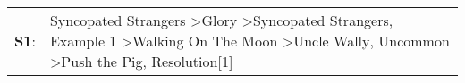 \begin{supertabular}{p{0.03\textwidth}p{0.92\textwidth}}
 \textbf{S1}:  &  Syncopated Strangers\textsuperscript{} \textgreater \enspace Glory\textsuperscript{} \textgreater \enspace Syncopated Strangers\textsuperscript{}, \enspace Example 1\textsuperscript{} \textgreater \enspace Walking On The Moon\textsuperscript{} \textgreater \enspace Uncle Wally\textsuperscript{}, \enspace Uncommon\textsuperscript{} \textgreater \enspace Push the Pig\textsuperscript{}, \enspace Resolution[1]\textsuperscript{}  \enspace  \\
\end{supertabular}
